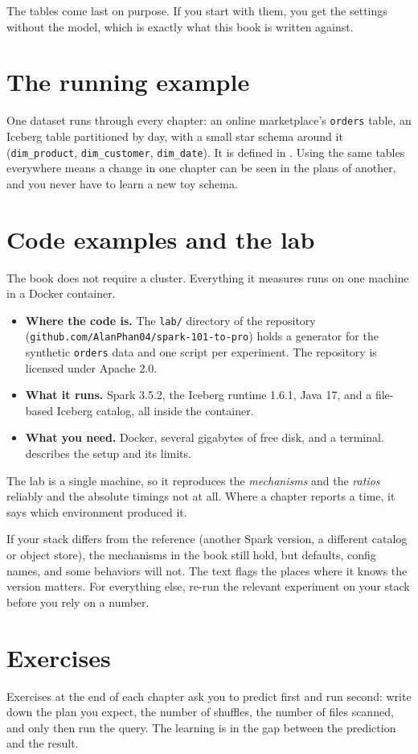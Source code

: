 The tables come last on purpose. If you start with them, you get the settings
without the model, which is exactly what this book is written against.

\section*{The running example}

One dataset runs through every chapter: an online marketplace's \texttt{orders}
table, an Iceberg table partitioned by day, with a small star schema around it
(\texttt{dim\_product}, \texttt{dim\_customer}, \texttt{dim\_date}). It is
defined in . Using the same tables everywhere means a change in
one chapter can be seen in the plans of another, and you never have to learn a new
toy schema.

\section*{Code examples and the lab}

The book does not require a cluster. Everything it measures runs on one machine
in a Docker container.

\begin{itemize}
  \item \textbf{Where the code is.} The \texttt{lab/} directory of the repository
  (\nolinkurl{github.com/AlanPhan04/spark-101-to-pro}) holds a generator for the
  synthetic \texttt{orders} data and one script per experiment. The repository
  is licensed under Apache 2.0.
  \item \textbf{What it runs.} Spark 3.5.2, the Iceberg runtime 1.6.1, Java 17, and
  a file-based Iceberg catalog, all inside the container.
  \item \textbf{What you need.} Docker, several gigabytes of free disk, and a
  terminal.  describes the setup and its limits.
\end{itemize}

The lab is a single machine, so it reproduces the \emph{mechanisms} and the
\emph{ratios} reliably and the absolute timings not at all. Where a chapter reports
a time, it says which environment produced it.

If your stack differs from the reference (another Spark version, a different
catalog or object store), the mechanisms in the book still hold, but defaults,
config names, and some behaviors will not. The text flags the places where it knows
the version matters. For everything else, re-run the relevant experiment on your
stack before you rely on a number.

\section*{Exercises}

Exercises at the end of each chapter ask you to predict first and run second:
write down the plan you expect, the number of shuffles, the number of files
scanned, and only then run the query. The learning is in the gap between the
prediction and the result.
